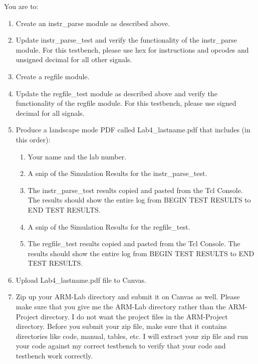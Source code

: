 You are to:
\begin{enumerate}
\item Create an instr\_parse module as described above.
\item Update instr\_parse\_test and verify the functionality of the instr\_parse module.  For this testbench, please use hex for instructions and opcodes and unsigned decimal for all other signals.
\item Create a regfile module.
\item Update the regfile\_test module as described above and verify the functionality of the regfile module.  For this testbench, please use signed decimal for all signals.
\item Produce a landscape mode PDF called Lab4\_lastname.pdf that includes (in this order):
\begin{enumerate}
	\item Your name and the lab number.
	\item A snip of the Simulation Results for the instr\_parse\_test.  
	\item The instr\_parse\_test results copied and pasted from the Tcl Console.  The results should show the entire log from BEGIN TEST RESULTS to END TEST RESULTS.
	\item A snip of the Simulation Results for the regfile\_test.    
	\item The regfile\_test results copied and pasted from the Tcl Console.  The results should show the entire log from BEGIN TEST RESULTS to END TEST RESULTS.
\end{enumerate}
\item Upload Lab4\_lastname.pdf file to Canvas.
\item Zip up your ARM-Lab directory and submit it on Canvas as well.  Please make sure that you give me the ARM-Lab directory rather than the ARM-Project directory.  I do not want the project files in the ARM-Project directory.  Before you submit your zip file, make sure that it contains directories like code, manual, tables, etc.  I will extract your zip file and run your code against my correct testbench to verify that your code and testbench work correctly.
\end{enumerate} 